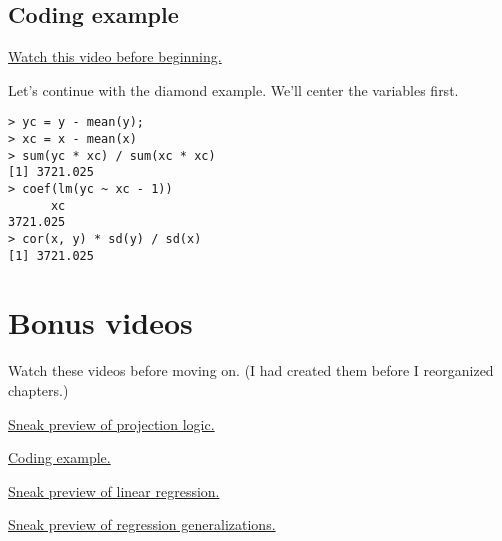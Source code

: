 \subsection{Coding example}

\href{https://www.youtube.com/watch?v=CrqNQEYF-nU&list=PLpl-gQkQivXhdgUCdaUQcdb31CRe8Mm2y&index=9}{Watch this video before beginning.}

Let's continue with the diamond example. We'll center the variables first.
\begin{verbatim}
> yc = y - mean(y);
> xc = x - mean(x)
> sum(yc * xc) / sum(xc * xc)
[1] 3721.025
> coef(lm(yc ~ xc - 1))
      xc 
3721.025 
> cor(x, y) * sd(y) / sd(x)
[1] 3721.025
\end{verbatim}

\section{Bonus videos}

\noindent
Watch these videos before moving on. (I had created them before I reorganized chapters.)

\href{https://www.youtube.com/watch?v=lmv88DtCNiU&list=PLpl-gQkQivXhdgUCdaUQcdb31CRe8Mm2y&index=10}{Sneak preview of projection logic.}

\href{https://www.youtube.com/watch?v=0Ld7sZ8FUs0&list=PLpl-gQkQivXhdgUCdaUQcdb31CRe8Mm2y&index=11}{Coding example.}

\href{https://www.youtube.com/watch?v=U5FAOdBDb90&list=PLpl-gQkQivXhdgUCdaUQcdb31CRe8Mm2y&index=12}{Sneak preview of linear regression.}

\href{https://www.youtube.com/watch?v=Ir1L-STFKfA&list=PLpl-gQkQivXhdgUCdaUQcdb31CRe8Mm2y&index=13}{Sneak preview of regression generalizations.}
